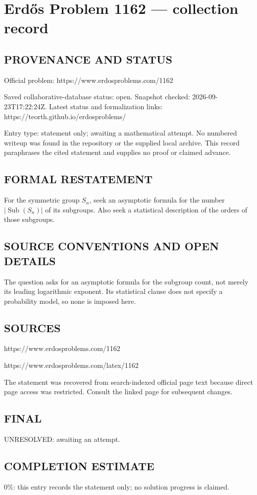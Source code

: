 \section*{Erd\H{o}s Problem 1162 --- collection record}

\subsection*{PROVENANCE AND STATUS}
Official problem: https://www.erdosproblems.com/1162

Saved collaborative-database status: open.
Snapshot checked: 2026-09-23T17:22:24Z.
Latest status and formalization links: https://teorth.github.io/erdosproblems/

Entry type: statement only; awaiting a mathematical attempt. No numbered writeup was found in the repository or the supplied local archive. This record paraphrases the cited statement and supplies no proof or claimed advance.

\subsection*{FORMAL RESTATEMENT}
For the symmetric group $S_n$, seek an asymptotic formula for the number $|\operatorname{Sub}(S_n)|$ of its subgroups. Also seek a statistical description of the orders of those subgroups.

\subsection*{SOURCE CONVENTIONS AND OPEN DETAILS}
The question asks for an asymptotic formula for the subgroup count, not merely its leading logarithmic exponent. Its statistical clause does not specify a probability model, so none is imposed here.

\subsection*{SOURCES}
https://www.erdosproblems.com/1162

https://www.erdosproblems.com/latex/1162

The statement was recovered from search-indexed official page text because direct page access was restricted. Consult the linked page for subsequent changes.

\subsection*{FINAL}
UNRESOLVED: awaiting an attempt.

\subsection*{COMPLETION ESTIMATE}
$0\%$: this entry records the statement only; no solution progress is claimed.
